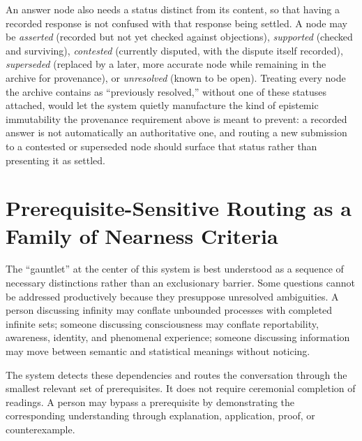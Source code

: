 \documentclass[11pt]{article}
\begin{document}
An answer node also needs a status distinct from its content, so that having a recorded response is not confused with that response being settled. A node may be \emph{asserted} (recorded but not yet checked against objections), \emph{supported} (checked and surviving), \emph{contested} (currently disputed, with the dispute itself recorded), \emph{superseded} (replaced by a later, more accurate node while remaining in the archive for provenance), or \emph{unresolved} (known to be open). Treating every node the archive contains as ``previously resolved,'' without one of these statuses attached, would let the system quietly manufacture the kind of epistemic immutability the provenance requirement above is meant to prevent: a recorded answer is not automatically an authoritative one, and routing a new submission to a contested or superseded node should surface that status rather than presenting it as settled.

\section{Prerequisite-Sensitive Routing as a Family of Nearness Criteria}

The ``gauntlet'' at the center of this system is best understood as a sequence of necessary distinctions rather than an exclusionary barrier. Some questions cannot be addressed productively because they presuppose unresolved ambiguities. A person discussing infinity may conflate unbounded processes with completed infinite sets; someone discussing consciousness may conflate reportability, awareness, identity, and phenomenal experience; someone discussing information may move between semantic and statistical meanings without noticing.

The system detects these dependencies and routes the conversation through the smallest relevant set of prerequisites. It does not require ceremonial completion of readings. A person may bypass a prerequisite by demonstrating the corresponding understanding through explanation, application, proof, or counterexample.
\end{document}
